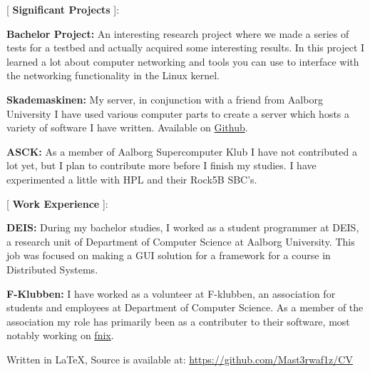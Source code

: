 \documentclass[a4paper, 14pt]{article}
\newcommand{\cvsection}[2]{
    \begin{minipage}[t]{.25\textwidth}
        [ \textbf{#1} ]:
    \end{minipage}
    \vrule
    \hspace{2mm}
    \begin{minipage}[t]{.70\textwidth}
        #2
    \end{minipage}
    \vspace{.25cm}
}
\begin{document}
    \cvsection{Significant Projects}{
        \textbf{Bachelor Project: } An interesting research project where we made a series of tests for a testbed and actually acquired some interesting results. 
        In this project I learned a lot about computer networking and tools you can use to interface with the networking functionality in the Linux kernel.

        \textbf{Skademaskinen: } My server, in conjunction with a friend from Aalborg University I have used various computer parts to create a server which hosts a variety of software I have written.
        Available on \href{https://github.com/Skademaskinen}{Github}.

        \textbf{ASCK: } As a member of Aalborg Supercomputer Klub I have not contributed a lot yet, but I plan to contribute more before I finish my studies. 
        I have experimented a little with HPL and their Rock5B SBC's.
    }
    
    \cvsection{Work Experience}{
        \textbf{DEIS: } During my bachelor studies, I worked as a student programmer at DEIS, a research unit of Department of Computer Science at Aalborg University. 
        This job was focused on making a GUI solution for a framework for a course in Distributed Systems.

        \textbf{F-Klubben: } I have worked as a volunteer at F-klubben, an association for students and employees at Department of Computer Science. 
        As a member of the association my role has primarily been as a contributer to their software, most notably working on \href{https://github.com/f-klubben/fnix}{fnix}.
    }

    \vspace*{\fill}
    \tiny Written in \LaTeX, Source is available at: \href{https://github.com/Mast3rwaf1z/CV}{https://github.com/Mast3rwaf1z/CV}
\end{document}
